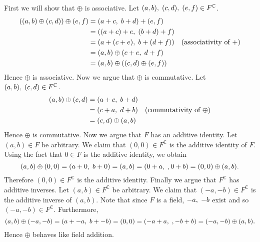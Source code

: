 \documentclass[12pt]{article}
\newcommand{\C}{\mathbb{C}}
\newcommand{\ttc}{, \hspace{1mm}}
\begin{document}
First we will show that $\oplus$ is associative. Let $(a,b)\ttc(c,d)\ttc(e,f)\in F^\C$.
\begin{align*}
	((a,b)\oplus(c,d))\oplus(e,f) & = (a + c\ttc b + d) + (e,f)\\
	& = ((a + c) + e\ttc (b + d) + f)\\
	& = (a + (c + e)\ttc b + (d + f)) & \text{(associativity of $+$)}\\
	& = (a,b) \oplus (c + e\ttc d + f)\\
	& = (a,b)\oplus ((c,d) \oplus (e,f))
\end{align*}
Hence $\oplus$ is associative. Now we argue that $\oplus$ is commutative. Let $(a,b)\ttc(c,d)\in F^\C$.
\begin{align*}
	(a,b)\oplus (c,d) & = (a + c\ttc b + d)\\
	& = (c + a\ttc d + b) & \text{(commutativity of $\oplus$)}\\
	& = (c,d)\oplus (a,b)
\end{align*}
Hence $\oplus$ is commutative. Now we argue that $F$ has an additive identity. Let $(a,b)\in F$ be arbitrary. We claim that $(0,0)\in F^\C$ is the additive identity of $F$. Using the fact that $0\in F$ is the additive identity, we obtain
	\[
		(a,b)\oplus (0,0) = (a + 0\ttc b + 0) = (a,b) = (0 + a\ttc, 0 + b) = (0,0) \oplus (a,b).
	\]
Therefore $(0,0)\in F^\C$ is the additive identity. Finally we argue that $F^\C$ has additive inverses. Let $(a,b)\in F^\C$ be arbitrary. We claim that $(-a,-b)\in F^\C$ is the additive inverse of $(a,b)$. Note that since $F$ is a field, $-a\ttc -b$ exist and so $(-a,-b)\in F^\C$. Furthermore,
	\[
		(a,b)\oplus (-a,-b) = (a + -a\ttc b + -b) = (0,0) = (-a + a\ttc, -b + b) = (-a,-b) \oplus (a,b).
	\]
Hence $\oplus$ behaves like field addition. 
\end{document}
